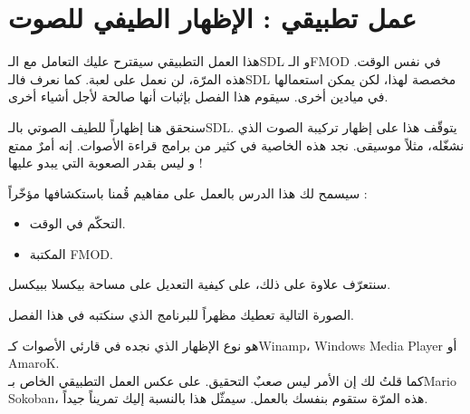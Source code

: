 \chapter{عمل تطبيقي : الإظهار الطيفي للصوت}

هذا العمل التطبيقي سيقترح عليك التعامل مع الـ\textenglish{SDL}
و الـ\textenglish{FMOD}
في نفس الوقت. هذه المرّة، لن نعمل على لعبة. كما نعرف فالـ\textenglish{SDL}
مخصصة لهذا، لكن يمكن استعمالها في ميادين أخرى. سيقوم هذا الفصل بإثبات أنها صالحة لأجل أشياء أخرى.

سنحقق هنا إظهاراً للطيف الصوتي بالـ\textenglish{SDL}.
يتوقّف هذا على إظهار تركيبة الصوت الذي نشغّله، مثلاً موسيقى. نجد هذه الخاصية في كثير من برامج قراءة الأصوات. إنه أمرٌ ممتع و ليس بقدر الصعوبة التي يبدو عليها !

سيسمح لك هذا الدرس بالعمل على مفاهيم قُمنا باستكشافها مؤخّراً :

\begin{itemize}
	\item التحكّم في الوقت.
	\item المكتبة 
	\textenglish{FMOD}.
\end{itemize}

سنتعرّف علاوة على ذلك، على كيفية التعديل على مساحة بيكسلا ببيكسل.

الصورة التالية تعطيك مظهراً للبرنامج الذي سنكتبه في هذا الفصل.


هو نوع الإظهار الذي نجده في قارئي الأصوات كـ\textenglish{Winamp}،
\textenglish{Windows Media Player} أو \textenglish{AmaroK}.\\
كما قلتُ لك إن الأمر ليس صعبٌ التحقيق. على عكس العمل التطبيقي الخاص بـ\textenglish{Mario Sokoban}،
هذه المرّة ستقوم بنفسك بالعمل. سيمثّل هذا بالنسبة إليك تمريناً جيداً.
